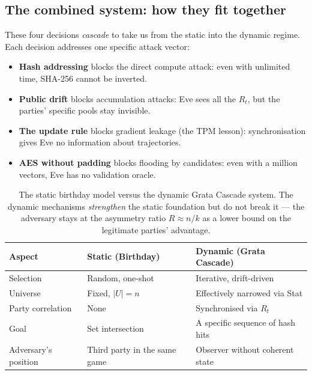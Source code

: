 \documentclass[11pt,a4paper]{article}
\begin{document}
\subsection{The combined system: how they fit together}\label{pop:design-combined}

These four decisions \emph{cascade} to take us from the static into the dynamic regime. Each decision addresses one specific attack vector:

\begin{itemize}[leftmargin=*]
\item \textbf{Hash addressing} blocks the direct compute attack: even with unlimited time, SHA-256 cannot be inverted.
\item \textbf{Public drift} blocks accumulation attacks: Eve sees all the $R_t$, but the parties' specific pools stay invisible.
\item \textbf{The update rule} blocks gradient leakage (the TPM lesson): synchronisation gives Eve no information about trajectories.
\item \textbf{AES without padding} blocks flooding by candidates: even with a million vectors, Eve has no validation oracle.
\end{itemize}

\begin{table}[ht]
\centering
\small
\begin{tabular}{lll}
\toprule
Aspect & Static (Birthday) & Dynamic (Grata Cascade) \\
\midrule
Selection & Random, one-shot & Iterative, drift-driven \\
Universe & Fixed, $|U| = n$ & Effectively narrowed via Stat \\
Party correlation & None & Synchronised via $R_t$ \\
Goal & Set intersection & A specific sequence of hash hits \\
Adversary's position & Third party in the same game & Observer without coherent state \\
\bottomrule
\end{tabular}
\caption{The static birthday model versus the dynamic Grata Cascade system. The dynamic mechanisms \emph{strengthen} the static foundation but do not break it --- the adversary stays at the asymmetry ratio $R \approx n/k$ as a lower bound on the legitimate parties' advantage.}
\label{tab:pop-static-vs-dynamic}
\end{table}
\end{document}
